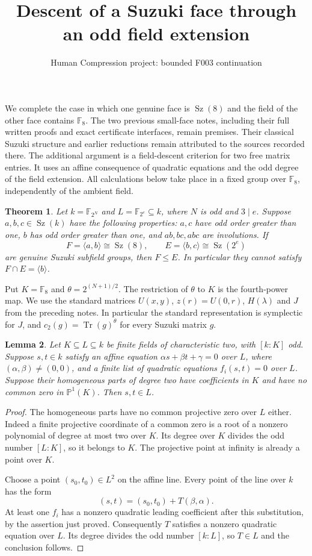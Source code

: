 \documentclass[11pt,a4paper]{article}
\title{Descent of a Suzuki face through an odd field extension}
\author{Human Compression project: bounded F003 continuation}
\date{}
\newtheorem{theorem}{Theorem}
\newtheorem{lemma}[theorem]{Lemma}
\newcommand{\Sz}{\operatorname{Sz}}
\newcommand{\Tr}{\operatorname{Tr}}
\newcommand{\F}{\mathbb F}
\begin{document}
\maketitle

We complete the case in which one genuine face is $\Sz(8)$ and the
field of the other face contains $\F_8$. The two previous small-face
notes, including their full written proofs and exact certificate
interfaces, remain premises. Their classical Suzuki structure and
earlier reductions remain attributed to the sources recorded there.
The additional argument is a field-descent criterion for two free
matrix entries. It uses an affine consequence of quadratic equations
and the odd degree of the field extension. All calculations below take
place in a fixed group over $\F_8$, independently of the ambient field.

\begin{theorem}\label{main}
Let $k=\F_{2^N}$ and $L=\F_{2^e}\subseteq k$, where $N$ is odd
and $3\mid e$. Suppose $a,b,c\in\Sz(k)$ have the following properties:
$a,c$ have odd order greater than one, $b$ has odd order greater than
one, and $ab,bc,abc$ are involutions. If
\[
 F=\langle a,b\rangle\cong\Sz(8),\qquad
 E=\langle b,c\rangle\cong\Sz(2^e)
\]
are genuine Suzuki subfield groups, then $F\le E$.
In particular they cannot satisfy $F\cap E=\langle b\rangle$.
\end{theorem}

Put $K=\F_8$ and $\theta=2^{(N+1)/2}$. The restriction of $\theta$
to $K$ is the fourth-power map. We use the standard matrices
$U(x,y)$, $z(r)=U(0,r)$, $H(\lambda)$ and $J$ from the preceding
notes. In particular the standard representation is symplectic for
$J$, and $c_2(g)=\Tr(g)^\theta$ for every Suzuki matrix $g$.

\begin{lemma}\label{descent}
Let $K\subseteq L\subseteq k$ be finite fields of characteristic two,
with $[k:K]$ odd.
Suppose $s,t\in k$ satisfy an affine equation
$\alpha s+\beta t+\gamma=0$ over $L$, where
$(\alpha,\beta)\ne(0,0)$, and a finite list of quadratic equations
$f_i(s,t)=0$ over $L$. Suppose their homogeneous parts of degree two
have coefficients in $K$ and have no common zero in $\mathbb P^1(K)$.
Then $s,t\in L$.
\end{lemma}
\begin{proof}
The homogeneous parts have no common projective zero over $L$ either.
Indeed a finite projective coordinate of a common zero is a root of
a nonzero polynomial of degree at most two over $K$. Its degree over
$K$ divides the odd number $[L:K]$, so it belongs to $K$.
The projective point at infinity is already a point over $K$.

Choose a point $(s_0,t_0)\in L^2$ on the affine line. Every point of
the line over $k$ has the form
\[
             (s,t)=(s_0,t_0)+T(\beta,\alpha).
\]
At least one $f_i$ has a nonzero quadratic leading coefficient after
this substitution, by the assertion just proved. Consequently $T$
satisfies a nonzero quadratic equation over $L$. Its degree divides
the odd number $[k:L]$, so $T\in L$ and the conclusion follows.
\end{proof}
\end{document}
